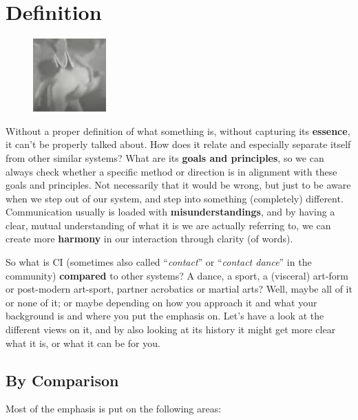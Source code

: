 \chapter{Definition}\label{ch:definition}

\begin{figure}
\centering
\includegraphics[width=0.25\textwidth]{images/definition}
\end{figure}

Without a proper definition of what something is, without capturing its \textbf{essence}, it can't be properly talked about.
How does it relate and especially separate itself from other similar systems?
What are its \textbf{goals and principles}, so we can always check whether a specific method or direction is in alignment with these goals and principles.
Not necessarily that it would be wrong, but just to be aware when we step out of our system, and step into something (completely) different.
Communication usually is loaded with \textbf{misunderstandings}, and by having a clear, mutual understanding of what it is we are actually referring to, we can create more \textbf{harmony} in our interaction through clarity (of words).

So what is CI (sometimes also called ``\textit{contact}'' or ``\textit{contact dance}'' in the community) \textbf{compared} to other systems?
A dance, a sport, a (visceral) art-form or post-modern art-sport, partner acrobatics or martial arts?
Well, maybe all of it or none of it; or maybe depending on how you approach it and what your background is and where you put the emphasis on.
Let's have a look at the different views on it, and by also looking at its history it might get more clear what it is, or what it can be for you.

\section{By Comparison}\label{sec:by-comparison}

Most of the emphasis is put on the following areas:


